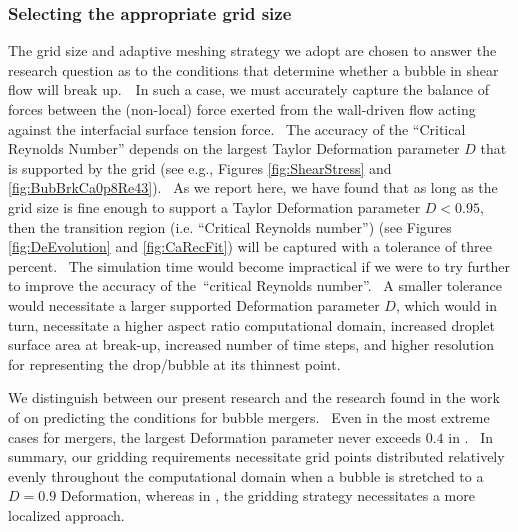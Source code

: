 \documentclass{elsarticle}
\begin{document}
\subsubsection{Selecting the appropriate grid size \label{convergence} }

The grid size and adaptive meshing strategy we adopt are chosen to answer the research question as to the conditions that determine whether a bubble in shear flow will break up.  In such a case, we must accurately capture the balance of forces between the (non-local) force exerted from the wall-driven flow acting against the interfacial surface tension force.  The accuracy of the ``Critical Reynolds Number'' depends on the largest Taylor Deformation parameter $D$ that is supported by the grid (see e.g., Figures \ref{fig:ShearStress} and \ref{fig:BubBrkCa0p8Re43}).  As we report here, we have found that as long as the grid size is fine enough to support a Taylor Deformation parameter $D<0.95$, then the transition region (i.e. ``Critical Reynolds number'') (see Figures \ref{fig:DeEvolution} and \ref{fig:CaRecFit}) will be captured with a tolerance of three percent.  The simulation time would become impractical if we were to try further to improve the accuracy of the ``critical Reynolds number''.  A smaller tolerance would necessitate a larger supported Deformation parameter $D$, which would in turn, necessitate a higher aspect ratio computational domain, increased droplet surface area at break-up, increased number of time steps, and higher resolution for representing the drop/bubble at its thinnest point.

We distinguish between our present research and the research found in the work of \citet{zhang2021three,zhang2022three} on predicting the conditions for bubble mergers.  Even in the most extreme cases for mergers, the largest Deformation parameter never exceeds $0.4$ in \citet{zhang2021three}.  In summary, our gridding requirements necessitate grid points distributed relatively evenly throughout the computational domain when a bubble is stretched to a $D=0.9$ Deformation, whereas in \citet{zhang2021three}, the gridding strategy necessitates a more localized approach.
\end{document}
